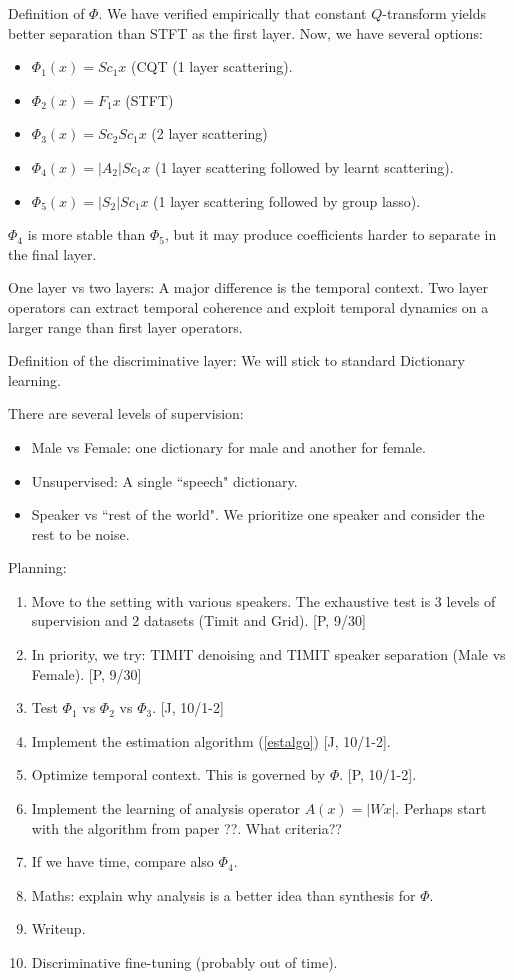 \documentclass[11pt]{article} %
\begin{document}
Definition of $\Phi$. We have verified empirically that constant $Q$-transform yields better 
separation than STFT as the first layer. Now, we have several options:
\begin{itemize}
\item $\Phi_1(x) = Sc_1 x $ (CQT (1 layer scattering). 
\item $\Phi_2(x) = F_1 x$ (STFT)
\item $\Phi_3(x) = Sc_2 Sc_1 x$ (2 layer scattering)
\item $\Phi_4(x)= |A_2| Sc_1 x$ (1 layer scattering followed by learnt scattering). 
\item $\Phi_5(x)= |S_2| Sc_1 x$ (1 layer scattering followed by group lasso). 
\end{itemize}

$\Phi_4$ is more stable than $\Phi_5$, but it may produce coefficients harder to separate 
in the final layer. 

One layer vs two layers: A major difference is the temporal context. Two layer operators can
extract temporal coherence and exploit temporal dynamics on a larger range than first layer operators. 

Definition of the discriminative layer: We will stick to standard Dictionary learning.

There are several levels of supervision:
\begin{itemize}
\item Male vs Female: one dictionary for male and another for female.
\item Unsupervised: A single ``speech" dictionary. 
\item Speaker vs ``rest of the world". We prioritize one speaker and consider the rest to be noise. 
\end{itemize}



Planning:
\begin{enumerate}
\item Move to the setting with various speakers. The exhaustive test
is 3 levels of supervision and 2 datasets (Timit and Grid). [P, 9/30]
\item In priority, we try: TIMIT denoising and TIMIT speaker separation (Male vs Female). [P, 9/30]
\item Test $\Phi_1$ vs $\Phi_2$ vs $\Phi_3$. [J, 10/1-2]
\item Implement the estimation algorithm (\ref{estalgo}) [J, 10/1-2].
\item Optimize temporal context. This is governed by $\Phi$. [P, 10/1-2].
\item Implement the learning of analysis operator $A(x) = |Wx|$. Perhaps start with 
the algorithm from paper ??. What criteria??
\item If we have time, compare also $\Phi_4$.
\item Maths: explain why analysis is a better idea than synthesis for $\Phi$. 
\item Writeup. 
\item Discriminative fine-tuning (probably out of time). 
\end{enumerate}
\end{document}
